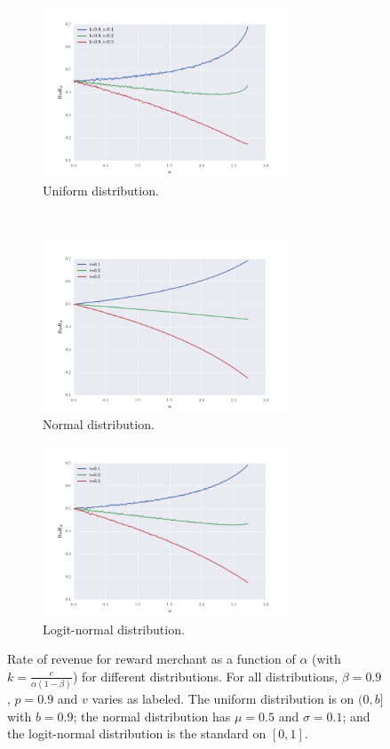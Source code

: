 \begin{figure}[t!]
\centering
\begin{subfigure}[t]{0.5\textwidth}
\centering
\includegraphics[height=2in]{./figures/rora_alpha_unif_v2.png}
\caption{Uniform distribution.}
\end{subfigure}%
~ 
\begin{subfigure}[t]{0.5\textwidth}
\centering
\includegraphics[height=2in]{./figures/rora_alpha_normal_v2.png}
\caption{Normal distribution.}
\end{subfigure}
\centering
\begin{subfigure}[t]{0.5\textwidth}
\centering
\includegraphics[height=2in]{./figures/rora_alpha_logit_v2.png}
\caption{Logit-normal distribution.}
\end{subfigure}

\caption{{Rate of revenue for reward merchant as a function of $\alpha$ (with $k = \frac{e}{\alpha(1-\beta)}$) for different distributions. For all distributions, $\beta = 0.9$, $p = 0.9$ and $v$ varies as labeled. The uniform distribution is on $(0,b]$ with $b = 0.9$; the normal distribution has $\mu = 0.5$ and $\sigma = 0.1$; and the logit-normal distribution is the standard on $[0,1]$.}}
\label{fig:alpha_max}
\end{figure}

